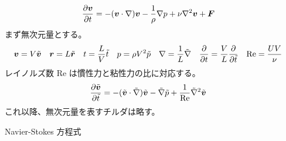 \documentclass[uplatex,diffipdfmx,a4paper,11pt]{jlreq}
\begin{document}
\begin{definition}
  \begin{align}
    \diffp{\bm{v}}{t} & = -(\bm{v}\cdot\nabla)\bm{v} - \frac{1}{\rho}\nabla p + \nu\nabla^2\bm{v} + \bm{F}
  \end{align}
  まず無次元量とする。
  \begin{align}
    \bm{v} & = V\tilde{\bm{v}} & \bm{r} & = L\tilde{\bm{r}} & t & = \frac{L}{V}\tilde{t} & p & = \rho V^2\tilde{p} & \nabla & = \frac{1}{L}\tilde{\nabla} & \diffp{}{t} & = \frac{V}{L}\diffp{}{\tilde{t}} & \mathrm{Re} & = \frac{UV}{\nu}
  \end{align}
  レイノルズ数 $\mathrm{Re}$ は慣性力と粘性力の比に対応する。
  \begin{align}
    \diffp{\tilde{\bm{v}}}{\tilde{t}} & = -(\tilde{\bm{v}}\cdot\tilde{\nabla})\tilde{\bm{v}} - \tilde{\nabla}\tilde{p} + \frac{1}{\mathrm{Re}}\tilde{\nabla}^2\tilde{\bm{v}}
  \end{align}
  これ以降、無次元量を表すチルダは略す。
\end{definition}
\begin{theorem}
  Navier-Stokes 方程式
\end{theorem}
\end{document}
